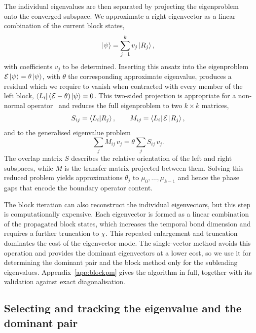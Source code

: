 The individual eigenvalues are then separated by projecting the eigenproblem onto the converged subspace. We approximate a right eigenvector as a linear combination of the current block states,
\begin{equation}
  \ket{\psi} = \sum_{j=1}^{k} v_j \ket{R_j},
  \label{eq:blockpm_ansatz}
\end{equation}
with coefficients $v_j$ to be determined. Inserting this ansatz into the eigenproblem $\mathcal{E}\ket{\psi}=\theta\ket{\psi}$, with $\theta$ the corresponding approximate eigenvalue, produces a residual which we require to vanish when contracted with every member of the left block, $\bra{L_i}(\mathcal{E}-\theta)\ket{\psi}=0$. This two-sided projection is appropriate for a non-normal operator~\cite{saad1992} and reduces the full eigenproblem to two $k\times k$ matrices,
\begin{equation}
  S_{ij}=\braket{L_i}{R_j},
  \qquad
  M_{ij}=\bra{L_i}\mathcal{E}\ket{R_j},
  \label{eq:blockpm_pencil}
\end{equation}
and to the generalised eigenvalue problem
\begin{equation}
  \sum_{j} M_{ij}\,v_j = \theta \sum_{j} S_{ij}\,v_j .
  \label{eq:blockpm_smallproblem}
\end{equation}
The overlap matrix $S$ describes the relative orientation of the left and right subspaces, while $M$ is the transfer matrix projected between them. Solving this reduced problem yields approximations $\theta_j$ to $\mu_0,\dots,\mu_{k-1}$ and hence the phase gaps that encode the boundary operator content.

The block iteration can also reconstruct the individual eigenvectors, but this step is computationally expensive. Each eigenvector is formed as a linear combination of the propagated block states, which increases the temporal bond dimension and requires a further truncation to $\chi$. This repeated enlargement and truncation dominates the cost of the eigenvector mode. The single-vector method avoids this operation and provides the dominant eigenvectors at a lower cost, so we use it for determining the dominant pair and the block method only for the subleading eigenvalues. Appendix~\ref{app:blockpm} gives the algorithm in full, together with its validation against exact diagonalisation.

\subsection{Selecting and tracking the eigenvalue and the dominant pair}
\label{sec:reach}

